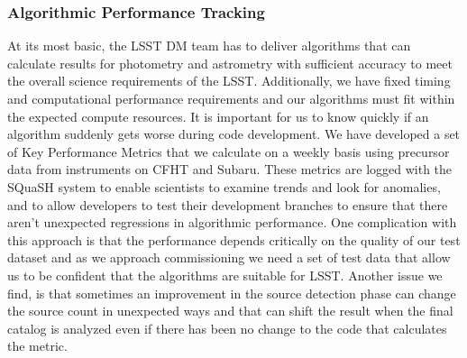 \subsubsection{Algorithmic Performance Tracking}

At its most basic, the LSST DM team has to deliver algorithms that can calculate results for photometry and astrometry with sufficient accuracy to meet the overall science requirements of the LSST\cite{LPM-17}.
Additionally, we have fixed timing and computational performance requirements and our algorithms must fit within the expected compute resources.
It is important for us to know quickly if an algorithm suddenly gets worse during code development.
We have developed a set of Key Performance Metrics that we calculate on a weekly basis using precursor data from instruments on CFHT and Subaru.
These metrics are logged with the SQuaSH system\cite{SQR-009} to enable scientists to examine trends and look for anomalies, and to allow developers to test their development branches to ensure that there aren't unexpected regressions in algorithmic performance.
One complication with this approach is that the performance depends critically on the quality of our test dataset and as we approach commissioning we need a set of test data that allow us to be confident that the algorithms are suitable for LSST.
Another issue we find, is that sometimes an improvement in the source detection phase can change the source count in unexpected ways and that can shift the result when the final catalog is analyzed even if there has been no change to the code that calculates the metric.
